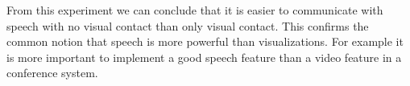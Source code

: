 \documentclass[10pt, a4paper]{article}
\begin{document}
From this experiment we can conclude that it is easier to communicate with speech with no visual contact than only visual contact. This confirms the common notion that speech is more powerful than visualizations. For example it is more important to implement a good speech feature than a video feature in a conference system.

%
%
\end{document}
